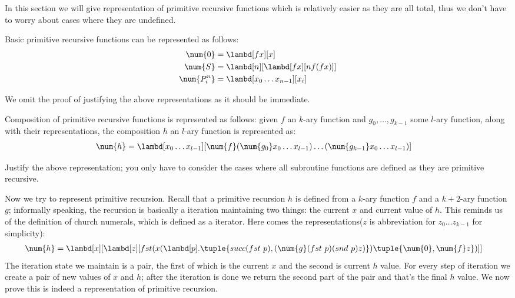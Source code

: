 \documentclass[../../../include/open-logic-section]{subfiles}
\begin{document}

In this section we will give representation of primitive recursive
functions which is relatively easier as they are all total, thus we don't have to worry about cases where they are
undefined.

Basic primitive recursive functions can be represented as follows:
\begin{align*}
  \num{0} &= \lambd[fx][x]\\
  \num{S} &= \lambd[n][\lambd[fx][n f (f x)]] \\
  \num{P^n_i} &= \lambd[x_0\dots x_{n-1}][x_i] \\
\end{align*}

We omit the proof of justifying the above representations as it should
be immediate.

Composition of primitive recursive functions is represented as
follows: given $f$ an $k$-ary function and $g_0, \dots, g_{k-1}$ some
$l$-ary function, along with their representations, the composition $h$ an $l$-ary function is
represented as:
\begin{align}
  \num{h} &= \lambd[x_0 \dots x_{l-1}][\num{f} (\num{g_0} x_0 \dots
            x_{l-1}) \dots (\num{g_{k-1}} x_0 \dots x_{l-1})]
\end{align}

\begin{prob}
  Justify the above representation; you only have to consider the
  cases where all subroutine functions are defined as they are primitive
  recursive.
\end{prob}


Now we try to represent primitive recursion. Recall that a primitive recursion $h$ is defined from a $k$-ary function $f$ and a $k+2$-ary function
$g$; informally speaking, the recursion is basically a iteration
maintaining two things: the current $x$ and current value of $h$. This
reminds us of the definition of church numerals, which is defined as a
iterator. Here comes the representations($z$ is abbreviation for $z_0
\dots z_{k-1}$ for simplicity):
\begin{align*}
  \num{h} &= \lambd[x][\lambd[z][fst (x (\lambd[p].\tuple{succ (fst ~ p),
            (\num{g} (fst ~ p) (snd ~ p) z)}) \tuple{\num{0}, \num{f} z})]]
\end{align*}
The iteration state we maintain is a pair, the first of which is the
current $x$ and the second is current $h$ value. For every step of
iteration we create a pair of new values of $x$ and $h$; after the
iteration is done we return the second part of the pair and that's the
final $h$ value. We now prove this is indeed a representation of
primitive recursion.
\end{document}

